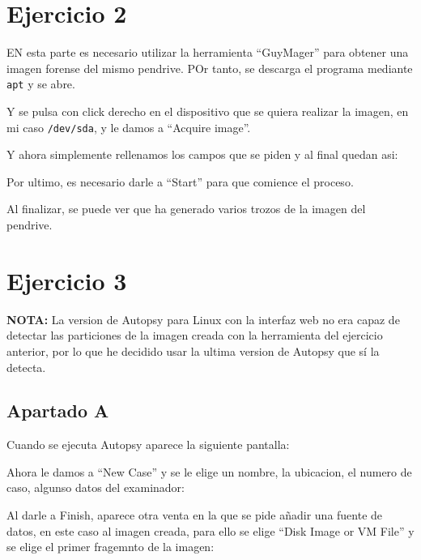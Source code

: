 \documentclass{article}
\begin{document}
\section*{Ejercicio 2}

EN esta parte es necesario utilizar la herramienta ``GuyMager'' para obtener una imagen forense del mismo pendrive. POr tanto, se descarga el programa mediante \verb|apt| y se abre.


Y se pulsa con click derecho en el dispositivo que se quiera realizar la imagen, en mi caso \verb|/dev/sda|, y le damos a ``Acquire image''.


Y ahora simplemente rellenamos los campos que se piden y al final quedan asi:


Por ultimo, es necesario darle a ``Start'' para que comience el proceso.


Al finalizar, se puede ver que ha generado varios trozos de la imagen del pendrive.


\section*{Ejercicio 3}

\textbf{NOTA: }La version de Autopsy para Linux con la interfaz web no era capaz de detectar las particiones de la imagen creada con la herramienta del ejercicio anterior, por lo que he decidido usar la ultima version de Autopsy que sí la detecta.

\subsection*{Apartado A}

Cuando se ejecuta Autopsy aparece la siguiente pantalla:


Ahora le damos a ``New Case'' y se le elige un nombre, la ubicacion, el numero de caso, algunso datos del examinador:


Al darle a Finish, aparece otra venta en la que se pide añadir una fuente de datos, en este caso al imagen creada, para ello se elige ``Disk Image or VM File'' y se elige el primer fragemnto de la imagen:
\end{document}
